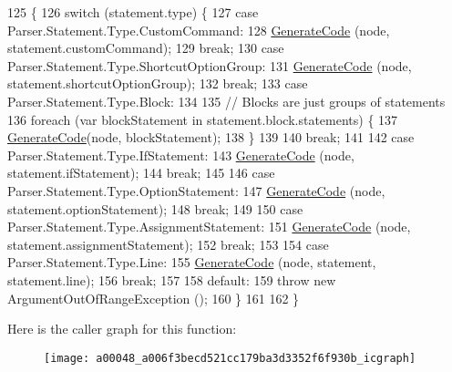 \begin{DoxyCode}
125                                                                  \{
126             \textcolor{keywordflow}{switch} (statement.type) \{
127             \textcolor{keywordflow}{case} Parser.Statement.Type.CustomCommand:
128                 \hyperlink{a00048_a006f3becd521cc179ba3d3352f6f930b}{GenerateCode} (node, statement.customCommand);
129                 \textcolor{keywordflow}{break};
130             \textcolor{keywordflow}{case} Parser.Statement.Type.ShortcutOptionGroup:
131                 \hyperlink{a00048_a006f3becd521cc179ba3d3352f6f930b}{GenerateCode} (node, statement.shortcutOptionGroup);
132                 \textcolor{keywordflow}{break};
133             \textcolor{keywordflow}{case} Parser.Statement.Type.Block:
134 
135                 \textcolor{comment}{// Blocks are just groups of statements}
136                 \textcolor{keywordflow}{foreach} (var blockStatement \textcolor{keywordflow}{in} statement.block.statements) \{
137                     \hyperlink{a00048_a006f3becd521cc179ba3d3352f6f930b}{GenerateCode}(node, blockStatement);
138                 \}
139 
140                 \textcolor{keywordflow}{break};
141 
142             \textcolor{keywordflow}{case} Parser.Statement.Type.IfStatement:
143                 \hyperlink{a00048_a006f3becd521cc179ba3d3352f6f930b}{GenerateCode} (node, statement.ifStatement);
144                 \textcolor{keywordflow}{break};
145 
146             \textcolor{keywordflow}{case} Parser.Statement.Type.OptionStatement:
147                 \hyperlink{a00048_a006f3becd521cc179ba3d3352f6f930b}{GenerateCode} (node, statement.optionStatement);
148                 \textcolor{keywordflow}{break};
149 
150             \textcolor{keywordflow}{case} Parser.Statement.Type.AssignmentStatement:
151                 \hyperlink{a00048_a006f3becd521cc179ba3d3352f6f930b}{GenerateCode} (node, statement.assignmentStatement);
152                 \textcolor{keywordflow}{break};
153 
154             \textcolor{keywordflow}{case} Parser.Statement.Type.Line:
155                 \hyperlink{a00048_a006f3becd521cc179ba3d3352f6f930b}{GenerateCode} (node, statement, statement.line);
156                 \textcolor{keywordflow}{break};
157 
158             \textcolor{keywordflow}{default}:
159                 \textcolor{keywordflow}{throw} \textcolor{keyword}{new} ArgumentOutOfRangeException ();
160             \}
161 
162         \}
\end{DoxyCode}


Here is the caller graph for this function\-:
\nopagebreak
\begin{figure}[H]
\begin{center}
\leavevmode
\texttt{[image: a00048\_a006f3becd521cc179ba3d3352f6f930b\_icgraph]}
\end{center}
\end{figure}


